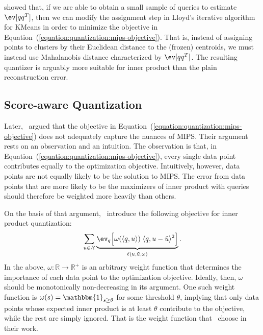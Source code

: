 \cite{guo2016Quip} showed that, if we are able to obtain a small sample of queries
to estimate $\ev[qq^T]$, then we can modify the assignment step in
Lloyd's iterative algorithm for KMeans in order to minimize the objective in
Equation~(\ref{equation:quantization:mips-objective}).
That is, instead of assigning points to clusters by their Euclidean distance to 
the (frozen) centroids, we must instead use Mahalanobis distance characterized by
$\ev[qq^T]$. The resulting quantizer is arguably more suitable for inner product
than the plain reconstruction error.

\subsection{Score-aware Quantization}

Later,~\cite{scann} argued that the objective in Equation~(\ref{equation:quantization:mips-objective})
does not adequately capture the nuances of MIPS. Their argument rests on an observation and an intuition.
The observation is that, in Equation~(\ref{equation:quantization:mips-objective}), every single
data point contributes equally to the optimization objective. Intuitively, however,
data points are not equally likely to be the solution to MIPS.
The error from data points that are more likely to be the maximizers of inner product
with queries should therefore be weighted more heavily than others.

On the basis of that argument,~\cite{scann} introduce the following objective
for inner product quantization:
\begin{equation}
    \label{equation:quantization:scann-objective}
    \sum_{u \in \mathcal{X}} \underbrace{\ev_q \Big[  \omega(\langle q, u \rangle) \;
    \langle q, u - \tilde{u} \rangle^2 \Big]}_{\ell(u, \tilde{u}, \omega)}.
\end{equation}
In the above, $\omega: \mathbb{R} \rightarrow \mathbb{R}^+$ is an arbitrary weight function
that determines the importance of each data point to the optimization objective.
Ideally, then, $\omega$ should be monotonically non-decreasing in its argument.
One such weight function is $\omega(s) = \mathbbm{1}_{s \geq \theta}$ for some threshold $\theta$,
implying that only data points whose expected inner product is at least $\theta$ contribute to the
objective, while the rest are simply ignored. That is the weight function that~\cite{scann}
choose in their work.

\medskip

